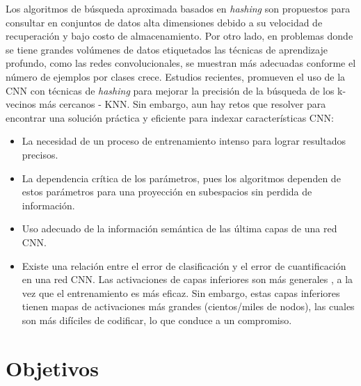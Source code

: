 Los  algoritmos de búsqueda aproximada  basados en \textit{hashing} son propuestos para consultar en conjuntos de datos  alta dimensiones debido a su velocidad de recuperación y bajo costo de almacenamiento.  Por otro lado, en problemas donde se tiene grandes volúmenes de datos etiquetados las técnicas de aprendizaje profundo, como las redes convolucionales, se muestran más adecuadas conforme el número de ejemplos por clases crece. Estudios recientes, promueven el uso de la \acf{CNN} con técnicas de  \textit{hashing} para mejorar la precisión de la búsqueda de los k-vecinos más cercanos - KNN.  Sin embargo, aun hay retos que resolver para encontrar una solución práctica y eficiente para indexar características  CNN:
\begin{itemize}
  \item La necesidad de un proceso de entrenamiento intenso para lograr resultados precisos.

  \item  La dependencia crítica de los parámetros, pues los algoritmos dependen de  estos parámetros  para una proyección en  subespacios sin perdida de información.

  \item  Uso adecuado de la informaci\'on sem\'antica de las  última capas de una red CNN.

  \item  Existe una relación entre el error de clasificación y el error de cuantificación en una red CNN. Las activaciones de capas inferiores son más generales \cite{DBLP:journals/corr/YosinskiCBL14}, a la vez que el entrenamiento es más eficaz. Sin embargo, estas capas inferiores tienen mapas de activaciones más grandes (cientos/miles de nodos), las cuales son más difíciles de codificar, lo que conduce a un compromiso.
 
\end{itemize}

 

\section{Objetivos}\label{objs}


